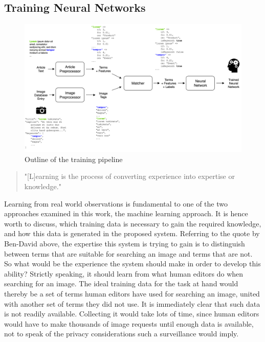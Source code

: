 \documentclass[11pt,a4paper,twoside]{article}
\begin{document}
\subsection{Training Neural Networks} \label{SystemTrain}

\begin{figure}[t]
  \includegraphics[width=\columnwidth]{picpic-training.png}
  \caption{Outline of the training pipeline}
  \label{fig:picpic-training}
\end{figure}

\begin{quote}
    "[L]earning is the process of converting experience into expertise or knowledge."
    
    \cite[p. 1]{Ben-David2014UnderstandingAlgorithms}
\end{quote}

\noindent Learning from real world observations is fundamental to one of the two approaches examined in this work, the machine learning approach. It is hence worth to discuss, which training data is necessary to gain the required knowledge, and how this data is generated in the proposed system. Referring to the quote by Ben-David above, the expertise this system is trying to gain is to distinguish between terms that are suitable for searching an image and terms that are not. So what would be the experience the system should make in order to develop this ability? Strictly speaking, it should learn from what human editors do when searching for an image. The ideal training data for the task at hand would thereby be a set of terms human editors have used for searching an image, united with another set of terms they did not use. It is immediately clear that such data is not readily available. Collecting it would take lots of time, since human editors would have to make thousands of image requests until enough data is available, not to speak of the privacy considerations such a surveillance would imply.
\end{document}
